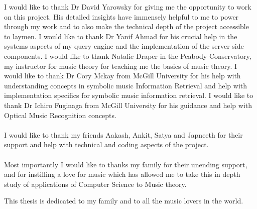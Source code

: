 \begin{frontmatter}
\begin{acknowledgment}

\noindent I would like to thank Dr David Yarowsky for giving me the opportunity to work on this project. His detailed insights have immensely helpful to me to power through my work and to also make the technical depth of the project accessible to laymen. I would like to thank Dr Yanif Ahmad for his crucial help in the systems aspects of my query engine and the implementation of the server side components. I would like to thank Natalie Draper in the Peabody Conservatory, my instructor for music theory for teaching me the basics of music theory. I would like to thank Dr Cory Mckay from McGill University for his help with understanding concepts in symbolic music Information Retrieval and help with implementation specifics for symbolic music information retrieval. I would like to thank Dr Ichiro Fuginaga from McGill University for his guidance and help with Optical Music Recognition concepts. \\\\
I would like to thank my friends Aakash, Ankit, Satya and Japneeth for their support and help with technical and coding aspects of the project. \\\\
Most importantly I would like to thanks my family for their unending support, and for instilling a love for music which has allowed me to take this in depth study of applications of Computer Science to Music theory.

\end{acknowledgment}

\begin{dedication}
 
This thesis is dedicated to my family and to all the music lovers in the world. 

\end{dedication}

\tableofcontents

\listoftables

\listoffigures

\end{frontmatter}
